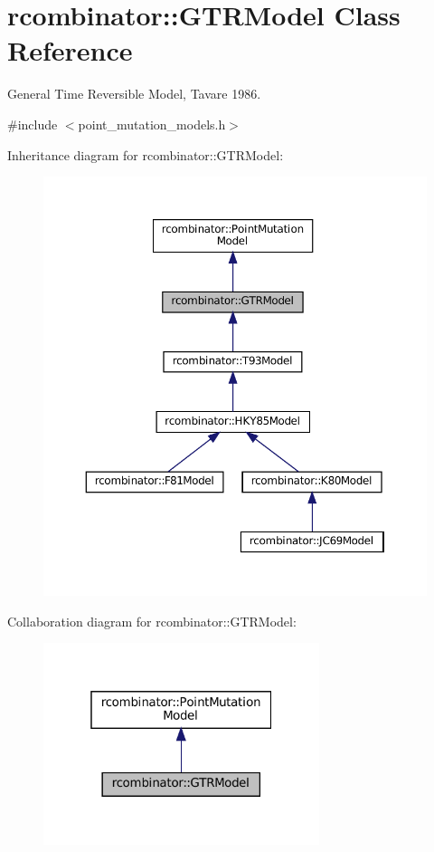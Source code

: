 \hypertarget{classrcombinator_1_1GTRModel}{}\section{rcombinator\+:\+:G\+T\+R\+Model Class Reference}
\label{classrcombinator_1_1GTRModel}


General Time Reversible Model, Tavare 1986.  




{\ttfamily \#include $<$point\+\_\+mutation\+\_\+models.\+h$>$}



Inheritance diagram for rcombinator\+:\+:G\+T\+R\+Model\+:\nopagebreak
\begin{figure}[H]
\begin{center}
\leavevmode
\includegraphics[width=350pt]{classrcombinator_1_1GTRModel__inherit__graph}
\end{center}
\end{figure}


Collaboration diagram for rcombinator\+:\+:G\+T\+R\+Model\+:\nopagebreak
\begin{figure}[H]
\begin{center}
\leavevmode
\includegraphics[width=229pt]{classrcombinator_1_1GTRModel__coll__graph}
\end{center}
\end{figure}

